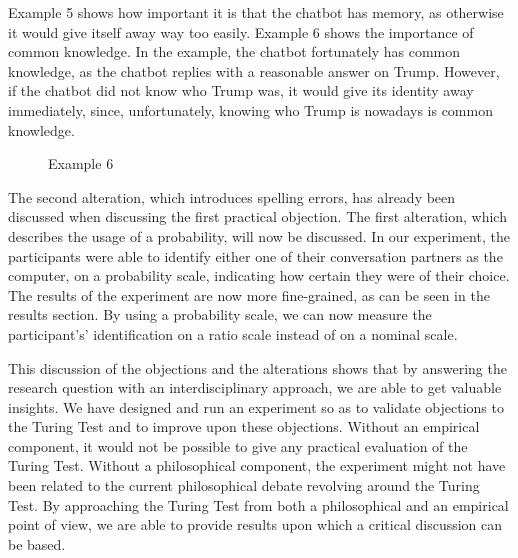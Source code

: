 Example 5 shows how important it is that the chatbot has memory, as otherwise it would give itself away way too easily. Example 6 shows the importance of common knowledge. In the example, the chatbot fortunately has common knowledge, as the chatbot replies with a reasonable answer on Trump. However, if the chatbot did not know who Trump was, it would give its identity away immediately, since, unfortunately, knowing who Trump is nowadays is common knowledge.

\begin{figure}[ht]
   \begin{center}
   \end{center}
   \caption{Example 6}
\end{figure}

The second alteration, which introduces spelling errors, has already been discussed when discussing the first practical objection. The first alteration, which describes the usage of a probability, will now be discussed. In our experiment, the participants were able to identify either one of their conversation partners as the computer, on a probability scale, indicating how certain they were of their choice. The results of the experiment are now more fine-grained, as can be seen in the results section. By using a probability scale, we can now measure the participant's' identification on a ratio scale instead of on a nominal scale.

This discussion of the objections and the alterations shows that by answering the research question with an interdisciplinary approach, we are able to get valuable insights. We have designed and run an experiment so as to validate objections to the Turing Test and to improve upon these objections. Without an empirical component, it would not be possible to give any practical evaluation of the Turing Test. Without a philosophical component, the experiment might not have been related to the current philosophical debate revolving around the Turing Test. By approaching the Turing Test from both a philosophical and an empirical point of view, we are able to provide results upon which a critical discussion can be based.
